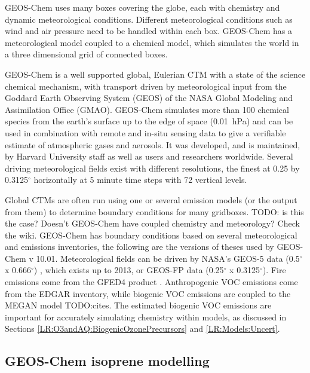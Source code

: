   GEOS-Chem uses many boxes covering the globe, each with chemistry and dynamic meteorological conditions.
  Different meteorological conditions such as wind and air pressure need to be handled within each box.      
  GEOS-Chem has a meteorological model coupled to a chemical model, which simulates the world in a three dimensional grid of connected boxes.
  
  GEOS-Chem is a well supported global, Eulerian CTM with a state of the science chemical mechanism, with transport driven by meteorological input from the Goddard Earth Observing System (GEOS) of the NASA Global Modeling and Assimilation Office (GMAO).
  GEOS-Chem simulates more than 100 chemical species from the earth's surface up to the edge of space (0.01~hPa) and can be used in combination with remote and in-situ sensing data to give a verifiable estimate of atmospheric gases and aerosols.
  It was developed, and is maintained, by Harvard University staff as well as users and researchers worldwide.
  Several driving meteorological fields exist with different resolutions, the finest at 0.25 by 0.3125$^\circ$ horizontally at 5 minute time steps with 72 vertical levels.
  
  Global CTMs are often run using one or several emission models (or the output from them) to determine boundary conditions for many gridboxes.
  TODO: is this the case? Doesn't GEOS-Chem have coupled chemistry and meteorology? Check the wiki.
  GEOS-Chem has boundary conditions based on several meteorological and emissions inventories, the following are the versions of theses used by GEOS-Chem v 10.01. 
  Meteorological fields can be driven by NASA's GEOS-5 data (0.5$^{\circ}$ x 0.666$^{\circ}$) \citep{Chen2009}, which exists up to 2013, or GEOS-FP data (0.25$^{\circ}$ x 0.3125$^{\circ}$).
  Fire emissions come from the GFED4 product \citep{Giglio2013}. 
  Anthropogenic VOC emissions come from the EDGAR inventory, while biogenic VOC emissions are coupled to the MEGAN model TODO:cites.
  The estimated biogenic VOC emissions are important for accurately simulating chemistry within models, as discussed in Sections \ref{LR:O3andAQ:BiogenicOzonePrecursors} and \ref{LR:Models:Uncert}.

  \subsection{GEOS-Chem isoprene modelling}
  \label{Model:GC:Isop}
